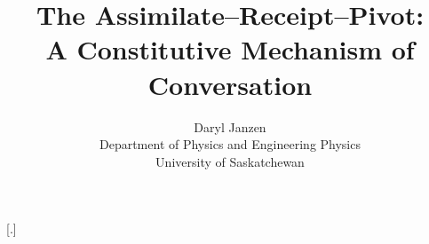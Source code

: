 \titleformat{\section}{\normalfont\large\bfseries}{\thesection}{0.7em}{}
\titleformat{\subsection}{\normalfont\normalsize\bfseries}{\thesubsection}{0.7em}{}
\titleformat{\paragraph}[runin]{\normalfont\normalsize\bfseries}{}{0pt}{}[.]

\setlength{\parindent}{0pt}
\setlength{\parskip}{0.6em}
\onehalfspacing

\title{\textbf{The Assimilate--Receipt--Pivot:\\A Constitutive Mechanism of Conversation}}
\author{Daryl Janzen\\\small Department of Physics and Engineering Physics\\\small University of Saskatchewan}
\date{}


\maketitle


